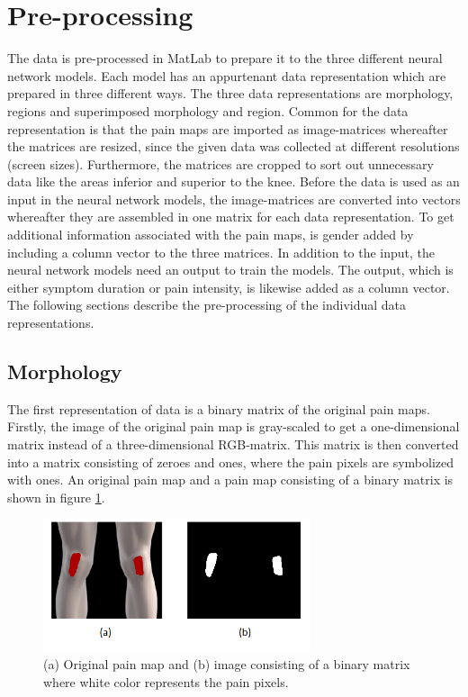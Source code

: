 \section{Pre-processing}
The data is pre-processed in MatLab to prepare it to the three different neural network models. Each model has an appurtenant data representation which are prepared in three different ways. The three data representations are morphology, regions and superimposed morphology and region. Common for the data representation is that the pain maps are imported as image-matrices whereafter the matrices are resized, since the given data was collected at different resolutions (screen sizes). Furthermore, the matrices are cropped to sort out unnecessary data like the areas inferior and superior to the knee.
Before the data is used as an input in the neural network models, the image-matrices are converted into vectors whereafter they are assembled in one matrix for each data representation. To get additional information associated with the pain maps, is gender added by including a column vector to the three matrices. 
In addition to the input, the neural network models need an output to train the models. The output, which is either symptom duration or pain intensity, is likewise added as a column vector. 
The following sections describe the pre-processing of the individual data representations. 

\subsection{Morphology} \label{sec:Morph}
The first representation of data is a binary matrix of the original pain maps.
Firstly, the image of the original pain map is gray-scaled to get a one-dimensional matrix instead of a three-dimensional RGB-matrix. This matrix is then converted into a matrix consisting of zeroes and ones, where the pain pixels are symbolized with ones. An original pain map and a pain map consisting of a binary matrix is shown in figure \ref{fig:cropbin7}.

\begin{figure} [H]
\centering
\includegraphics[width=0.7\textwidth]{figures/cropbin7}
\caption{(a) Original pain map and (b) image consisting of a binary matrix where white color represents the pain pixels.}
\label{fig:cropbin7}
\end{figure}

